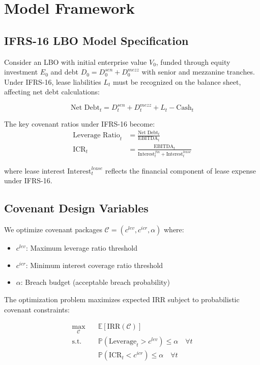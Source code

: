 \documentclass[11pt,a4paper]{article}
\newcommand{\E}{\mathbb{E}}
\newcommand{\Prob}{\mathbb{P}}
\begin{document}
\section{Model Framework}

\subsection{IFRS-16 LBO Model Specification}

Consider an LBO with initial enterprise value $V_0$, funded through equity investment $E_0$ and debt $D_0 = D_0^{sen} + D_0^{mezz}$ with senior and mezzanine tranches. Under IFRS-16, lease liabilities $L_t$ must be recognized on the balance sheet, affecting net debt calculations:

\begin{equation}
\text{Net Debt}_t = D_t^{sen} + D_t^{mezz} + L_t - \text{Cash}_t
\end{equation}

The key covenant ratios under IFRS-16 become:
\begin{align}
\text{Leverage Ratio}_t &= \frac{\text{Net Debt}_t}{\text{EBITDA}_t} \\
\text{ICR}_t &= \frac{\text{EBITDA}_t}{\text{Interest}_t^{fin} + \text{Interest}_t^{lease}}
\end{align}

where lease interest $\text{Interest}_t^{lease}$ reflects the financial component of lease expense under IFRS-16.

\subsection{Covenant Design Variables}

We optimize covenant packages $\mathcal{C} = (c^{lev}, c^{icr}, \alpha)$ where:
\begin{itemize}
\item $c^{lev}$: Maximum leverage ratio threshold
\item $c^{icr}$: Minimum interest coverage ratio threshold  
\item $\alpha$: Breach budget (acceptable breach probability)
\end{itemize}

The optimization problem maximizes expected IRR subject to probabilistic covenant constraints:

\begin{align}
\max_{\mathcal{C}} \quad &\E[\text{IRR}(\mathcal{C})] \\
\text{s.t.} \quad &\Prob(\text{Leverage}_t > c^{lev}) \leq \alpha \quad \forall t \\
&\Prob(\text{ICR}_t < c^{icr}) \leq \alpha \quad \forall t
\end{align}
\end{document}
